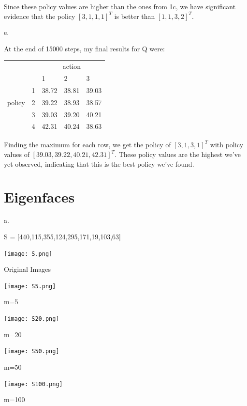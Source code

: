 \documentclass{article}
\begin{document}
Since these policy values are higher than the ones from 1c, we have significant evidence that the policy $[3,1,1,1]^T$ is better than $[1,1,3,2]^T$.

\noindent 
e. 

\noindent
At the end of 15000 steps, my final results for Q were:
\begin{table}[htb]
\begin{tabular}{lllll}
       &   & \multicolumn{3}{c}{action} \\
       &   & 1       & 2       & 3      \\
       & 1 & 38.72   & 38.81   & 39.03  \\
policy & 2 & 39.22   & 38.93   & 38.57  \\
       & 3 & 39.03   & 39.20   & 40.21  \\
       & 4 & 42.31   & 40.24   & 38.63 
\end{tabular}
\end{table}

\noindent 
Finding the maximum for each row, we get the policy of $[3,1,3,1]^T$ with policy values of $[39.03,39.22,40.21,42.31]^T$. These policy values are the highest we've yet observed, indicating that this is the best policy we've found.

\section{Eigenfaces}

a.

S = [440,115,355,124,295,171,19,103,63]

\begin{center}
    \texttt{[image: S.png]}
    \caption{Original Images}
\end{center}

\begin{center}
    \texttt{[image: S5.png]}
    \caption{m=5}
\end{center}

\begin{center}
    \texttt{[image: S20.png]}
    \caption{m=20}
\end{center}

\begin{center}
    \texttt{[image: S50.png]}
    \caption{m=50}
\end{center}

\begin{center}
    \texttt{[image: S100.png]}
    \caption{m=100}
\end{center}
\end{document}
